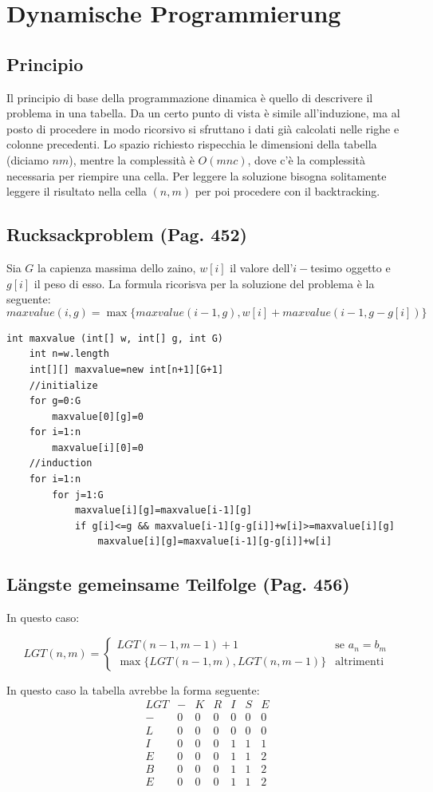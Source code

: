 \documentclass[a4paper]{book}
\newcommand{\lstIndent}{4}
\begin{document}
\section{Dynamische Programmierung}
\subsection{Principio}
Il principio di base della programmazione dinamica è quello di descrivere il problema in una tabella. Da un certo punto di vista è simile all'induzione, ma al posto di procedere in modo ricorsivo si sfruttano i dati già calcolati nelle righe e colonne precedenti. Lo spazio richiesto rispecchia le dimensioni della tabella (diciamo $nm$), mentre la complessità è $O(mnc)$, dove c'è la complessità necessaria per riempire una cella. Per leggere la soluzione bisogna solitamente leggere il risultato nella cella $(n,m)$ per poi procedere con il backtracking.
\subsection{Rucksackproblem (Pag. 452)}
Sia $G$ la capienza massima dello zaino, $w[i]$ il valore dell'$i-$tesimo oggetto e $g[i]$ il peso di esso. La formula ricorisva per la soluzione del problema è la seguente:
$$maxvalue(i,g)=\max \{maxvalue(i-1,g),w[i]+maxvalue(i-1,g-g[i])\}$$
\begin{lstlisting}[tabsize=\lstIndent]
int maxvalue (int[] w, int[] g, int G)
	int n=w.length
	int[][] maxvalue=new int[n+1][G+1]
	//initialize
	for g=0:G
		maxvalue[0][g]=0
	for i=1:n
		maxvalue[i][0]=0
	//induction
	for i=1:n	
		for j=1:G
			maxvalue[i][g]=maxvalue[i-1][g]
			if g[i]<=g && maxvalue[i-1][g-g[i]]+w[i]>=maxvalue[i][g]
				maxvalue[i][g]=maxvalue[i-1][g-g[i]]+w[i]
\end{lstlisting}
\subsection{Längste gemeinsame Teilfolge (Pag. 456)}
In questo caso:

\[
LGT(n,m) =\begin{cases}
LGT(n-1,m-1)+1 & \mbox{se } a_n=b_m \\
\max\{LGT(n-1,m),LGT(n,m-1)\} & \mbox{altrimenti}
\end{cases}
\]

In questo caso la tabella avrebbe la forma seguente:
$$\begin{array}{ccccccc}
LGT & - & K & R & I & S & E \\ 
- & 0 & 0 & 0 & 0 & 0 & 0 \\ 
L & 0 & 0 & 0 & 0 & 0 & 0 \\ 
I & 0 & 0 & 0 & 1 & 1 & 1 \\ 
E & 0 & 0 & 0 & 1 & 1 & 2 \\ 
B & 0 & 0 & 0 & 1 & 1 & 2 \\ 
E & 0 & 0 & 0 & 1 & 1 & 2
\end{array} $$
\end{document}
